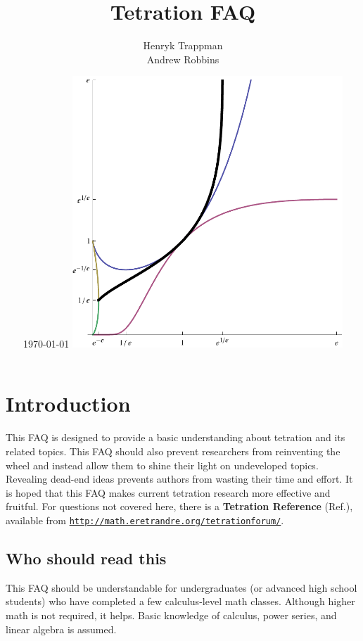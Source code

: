\documentclass[12pt]{article}
\theoremstyle{definition}
\begin{document}
\title{
\vskip2cm 
\bf \Huge Tetration FAQ
\vskip17pt
}
\author{
Henryk Trappman \\
Andrew Robbins
}
\date{
\vskip8pt 
\today
\vskip1cm 
\includegraphics[width=4in]{images/plot-selfroot-plus.pdf} 
}
\maketitle
\thispagestyle{empty}
\pagebreak
\tableofcontents

\pagebreak


\section{Introduction}

This FAQ is designed to provide a basic understanding about tetration and
its related topics. This FAQ should also prevent researchers from reinventing the wheel and instead allow them to shine their light on undeveloped topics. Revealing dead-end ideas prevents authors from wasting their time and effort. It is hoped that this FAQ makes current tetration research more effective and fruitful. For questions not covered here, there is a {\bf Tetration Reference} (Ref.), available from 
\href{http://math.eretrandre.org/tetrationforum/index.php}{\tt http://math.eretrandre.org/tetrationforum/}.

\subsection{Who should read this}
This FAQ should be understandable for undergraduates (or advanced high school students) who have completed a few calculus-level math classes. Although higher math is not required, it helps. Basic knowledge of calculus, power series, and linear algebra is assumed.
\end{document}
